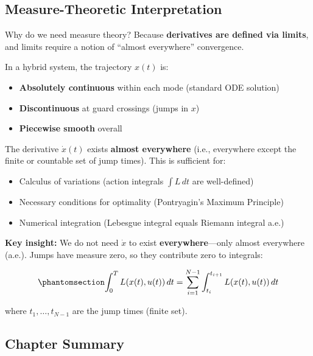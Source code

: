 \documentclass[
  letterpaper,
  DIV=11,
  numbers=noendperiod]{scrartcl}
\providecommand{\tightlist}{%
  \setlength{\itemsep}{0pt}\setlength{\parskip}{0pt}}\usepackage{longtable,booktabs,array}
\begin{document}
\subsection{Measure-Theoretic
Interpretation}\label{measure-theoretic-interpretation}

Why do we need measure theory? Because \textbf{derivatives are defined
via limits}, and limits require a notion of ``almost everywhere''
convergence.

In a hybrid system, the trajectory \(x(t)\) is:

\begin{itemize}
\tightlist
\item
  \textbf{Absolutely continuous} within each mode (standard ODE
  solution)
\item
  \textbf{Discontinuous} at guard crossings (jumps in \(x\))
\item
  \textbf{Piecewise smooth} overall
\end{itemize}

The derivative \(\dot{x}(t)\) exists \textbf{almost everywhere} (i.e.,
everywhere except the finite or countable set of jump times). This is
sufficient for:

\begin{itemize}
\tightlist
\item
  Calculus of variations (action integrals \(\int L \, dt\) are
  well-defined)
\item
  Necessary conditions for optimality (Pontryagin's Maximum Principle)
\item
  Numerical integration (Lebesgue integral equals Riemann integral a.e.)
\end{itemize}

\textbf{Key insight:} We do not need \(\dot{x}\) to exist
\textbf{everywhere}---only almost everywhere (a.e.). Jumps have measure
zero, so they contribute zero to integrals:

\begin{equation}\phantomsection\label{eq-hybrid-cost}{
\int_0^T L(x(t), u(t)) \, dt = \sum_{i=1}^{N-1} \int_{t_i}^{t_{i+1}} L(x(t), u(t)) \, dt
}\end{equation}

where \(t_1, \ldots, t_{N-1}\) are the jump times (finite set).

\subsection{Chapter Summary}\label{chapter-summary-1}
\end{document}
